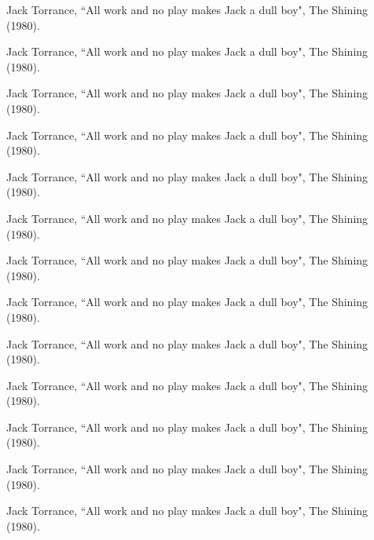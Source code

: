 	\item \hspace{15mm}Jack Torrance, ``All work and no play makes Jack a dull boy", The Shining (1980).
	\item \hspace{20mm}Jack Torrance, ``All work and no play makes Jack a dull boy", The Shining (1980).
	\item \hspace{25mm}Jack Torrance, ``All work and no play makes Jack a dull boy", The Shining (1980).
	\item \hspace{30mm}Jack Torrance, ``All work and no play makes Jack a dull boy", The Shining (1980).
	\item \hspace{25mm}Jack Torrance, ``All work and no play makes Jack a dull boy", The Shining (1980).
	\item \hspace{20mm}Jack Torrance, ``All work and no play makes Jack a dull boy", The Shining (1980).
	\item \hspace{15mm}Jack Torrance, ``All work and no play makes Jack a dull boy", The Shining (1980).
	\item \hspace{10mm}Jack Torrance, ``All work and no play makes Jack a dull boy", The Shining (1980).
	\item \hspace{5mm}Jack Torrance, ``All work and no play makes Jack a dull boy", The Shining (1980).
	\item Jack Torrance, ``All work and no play makes Jack a dull boy", The Shining (1980).
	\item \hspace{5mm}Jack Torrance, ``All work and no play makes Jack a dull boy", The Shining (1980).
	\item \hspace{10mm}Jack Torrance, ``All work and no play makes Jack a dull boy", The Shining (1980).
	\item \hspace{15mm}Jack Torrance, ``All work and no play makes Jack a dull boy", The Shining (1980).
